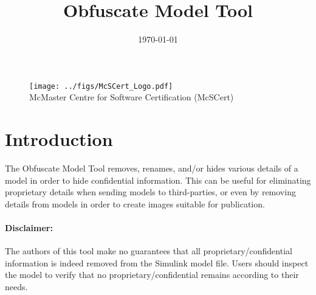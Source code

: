 \documentclass{article}
\makeatletter
\newcommand{\ToolName}{Obfuscate Model Tool\@\xspace}
\makeatother
\begin{document}
\title{\ToolName}
\date{\monthyeardate\today}
\maketitle
\vfill

\begin{figure}
	\centering
	\texttt{[image: ../figs/McSCert\_Logo.pdf]} \\
	McMaster Centre for Software Certification (McSCert)
\end{figure}

\newpage


\tableofcontents
\newpage

\section{Introduction}

The \ToolName removes, renames, and/or hides various details of a \Simulink model in order to hide confidential information.
This can be useful for eliminating proprietary details when sending models to third-parties, or even by removing details from models in order to create images suitable for publication.

\paragraph{Disclaimer:} The authors of this tool make no guarantees that all proprietary/confidential information is indeed removed from the Simulink model file. Users should inspect the model to verify that no proprietary/confidential remains according to their needs.

%
	
\end{document}
